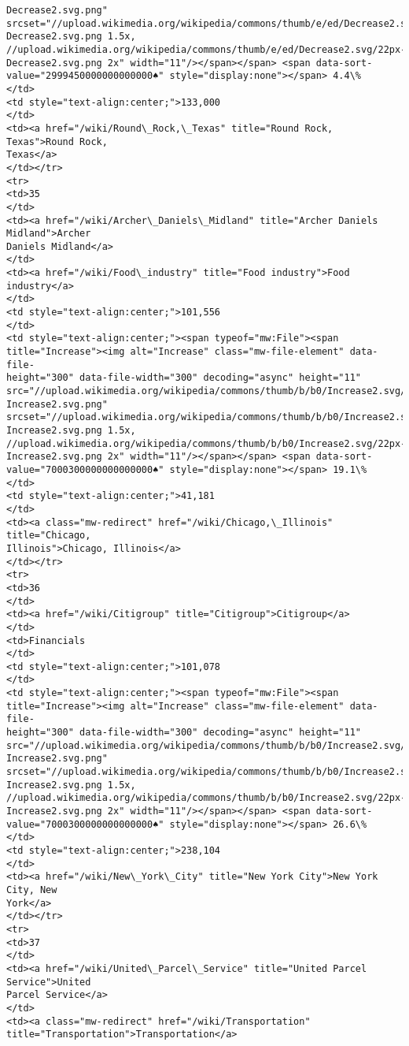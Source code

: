 \documentclass[11pt]{article}
\begin{document}
\begin{Verbatim}[commandchars=\\\{\}]
Decrease2.svg.png"
srcset="//upload.wikimedia.org/wikipedia/commons/thumb/e/ed/Decrease2.svg/17px-
Decrease2.svg.png 1.5x,
//upload.wikimedia.org/wikipedia/commons/thumb/e/ed/Decrease2.svg/22px-
Decrease2.svg.png 2x" width="11"/></span></span> <span data-sort-
value="2999450000000000000♠" style="display:none"></span> 4.4\%
</td>
<td style="text-align:center;">133,000
</td>
<td><a href="/wiki/Round\_Rock,\_Texas" title="Round Rock, Texas">Round Rock,
Texas</a>
</td></tr>
<tr>
<td>35
</td>
<td><a href="/wiki/Archer\_Daniels\_Midland" title="Archer Daniels Midland">Archer
Daniels Midland</a>
</td>
<td><a href="/wiki/Food\_industry" title="Food industry">Food industry</a>
</td>
<td style="text-align:center;">101,556
</td>
<td style="text-align:center;"><span typeof="mw:File"><span
title="Increase"><img alt="Increase" class="mw-file-element" data-file-
height="300" data-file-width="300" decoding="async" height="11"
src="//upload.wikimedia.org/wikipedia/commons/thumb/b/b0/Increase2.svg/11px-
Increase2.svg.png"
srcset="//upload.wikimedia.org/wikipedia/commons/thumb/b/b0/Increase2.svg/17px-
Increase2.svg.png 1.5x,
//upload.wikimedia.org/wikipedia/commons/thumb/b/b0/Increase2.svg/22px-
Increase2.svg.png 2x" width="11"/></span></span> <span data-sort-
value="7000300000000000000♠" style="display:none"></span> 19.1\%
</td>
<td style="text-align:center;">41,181
</td>
<td><a class="mw-redirect" href="/wiki/Chicago,\_Illinois" title="Chicago,
Illinois">Chicago, Illinois</a>
</td></tr>
<tr>
<td>36
</td>
<td><a href="/wiki/Citigroup" title="Citigroup">Citigroup</a>
</td>
<td>Financials
</td>
<td style="text-align:center;">101,078
</td>
<td style="text-align:center;"><span typeof="mw:File"><span
title="Increase"><img alt="Increase" class="mw-file-element" data-file-
height="300" data-file-width="300" decoding="async" height="11"
src="//upload.wikimedia.org/wikipedia/commons/thumb/b/b0/Increase2.svg/11px-
Increase2.svg.png"
srcset="//upload.wikimedia.org/wikipedia/commons/thumb/b/b0/Increase2.svg/17px-
Increase2.svg.png 1.5x,
//upload.wikimedia.org/wikipedia/commons/thumb/b/b0/Increase2.svg/22px-
Increase2.svg.png 2x" width="11"/></span></span> <span data-sort-
value="7000300000000000000♠" style="display:none"></span> 26.6\%
</td>
<td style="text-align:center;">238,104
</td>
<td><a href="/wiki/New\_York\_City" title="New York City">New York City, New
York</a>
</td></tr>
<tr>
<td>37
</td>
<td><a href="/wiki/United\_Parcel\_Service" title="United Parcel Service">United
Parcel Service</a>
</td>
<td><a class="mw-redirect" href="/wiki/Transportation"
title="Transportation">Transportation</a>

\end{Verbatim}
\end{document}
